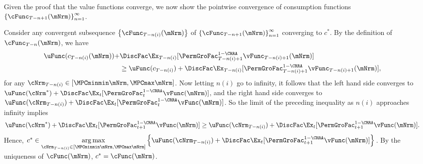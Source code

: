 \documentclass[\econtexRoot/BufferStockTheory]{subfiles}
\begin{document}
Given the proof that the value functions converge, we now show the
pointwise convergence of consumption functions
$\left\{\cFunc_{T-n+1}(\mNrm)\right\} _{n=1}^{\infty }$.

Consider any convergent subsequence $\left\{\cFunc_{T-n(i)}(\mNrm)\right\}$ of $\left\{\cFunc_{T-n+1}(\mNrm)\right\} _{n=1}^{\infty }$ converging to $c^*$.
By the definition of $\cFunc_{T-n}(\mNrm)$, we have
\begin{align}
  \begin{split}
    \uFunc(c_{T - n(i)}(\mNrm)) + & \DiscFac \Ex_{T - n(i)}[{\PermGroFac}_{T-n(i)+1}^{1 - \CRRA}\vFunc_{T-n(i)+1}(\mNrm)]  \\ & \geq  \uFunc(c_{T - n(i)}) + \DiscFac \Ex_{T - n(i)}[{\PermGroFac}_{T-n(i)+1}^{1 - \CRRA}\vFunc_{T-n(i)+1}(\mNrm)], 
    \end{split}
\end{align}
for any $\cNrm_{T - n(i)} \in [\MPCminmin \mNrm,\MPCmax \mNrm]$.
Now letting $n(i)$ go to infinity, it follows that the left hand side converges to $\uFunc(\cNrm^*) + \DiscFac \Ex_{t}[{\PermGroFac}_{t}^{1 - \CRRA}\vFunc(\mNrm)]$, and the right hand side converges to $\uFunc(\cNrm_{T - n(i)}) + \DiscFac \Ex_{t}[{\PermGroFac}_{t}^{1 - \CRRA}\vFunc(\mNrm)]$.
So the limit of the preceding inequality as $n(i)$ approaches infinity implies 
\begin{equation}
   \uFunc(\cNrm^*) + \DiscFac \Ex_{t}[{\PermGroFac}_{t + 1}^{1 - \CRRA}\vFunc(\mNrm)] \geq \uFunc(\cNrm_{T - n(i)}) + \DiscFac \Ex_{t}[{\PermGroFac}_{t + 1}^{1 - \CRRA}\vFunc(\mNrm)].
\end{equation}
Hence, $c^* \in \underset{\cNrm_{T - n(i)} \in [\MPCminmin \mNrm,\MPCmax \mNrm]}{\arg \max }\left\{ \uFunc(\cNrm_{T - n(i)}) + \DiscFac \Ex_{t}[{\PermGroFac}_{t + 1}^{1 - \CRRA}\vFunc(\mNrm)]\right\}$.
By the uniqueness of $\cFunc(\mNrm)$, $c^* = \cFunc(\mNrm)$.
\end{document}
